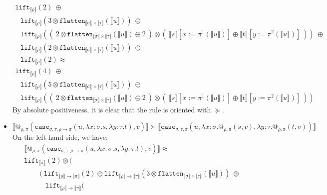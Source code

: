 \documentclass[a4paper,UKenglish,cleveref,autoref,numberwithinsect]{lipics-v2019}
\theoremstyle{definition}
\newcommand{\arrtype}{\rightarrow}
\newcommand{\abs}[2]{\lambda #1.#2}
\newcommand{\flatten}{\mathtt{flatten}}
\newcommand{\lift}{\mathtt{lift}}
\newcommand{\typeinterpret}[1]{\llbracket #1 \rrbracket}
\newcommand{\interpret}[1]{\llbracket #1 \rrbracket}
\begin{document}
\begin{itemize}
\[\begin{array}{l}
  \lift_{\typeinterpret{\rho}}(2)\ \oplus \\
  \phantom{A}
  \lift_{\typeinterpret{\rho}}(3 \otimes \flatten_{\typeinterpret{
    \sigma} \times \typeinterpret{\tau}}(\interpret{u}))\ \oplus \\
  \phantom{A}
  \lift_{\typeinterpret{\rho}}((\ 2 \otimes \flatten_{\typeinterpret{
    \sigma} \times \typeinterpret{\tau}}(\interpret{u}) \oplus 2\ )
    \otimes (\ \interpret{s}[x:=\pi^1(\interpret{u})] \oplus
    \interpret{t}[y:=\pi^2(\interpret{u})]\ ))\ \oplus \\
  \phantom{A}
  \lift_{\typeinterpret{\rho}}(2 \otimes \flatten_{\typeinterpret{\sigma}
    \times \typeinterpret{\tau}}(\interpret{u}))\ \oplus \\
  \phantom{A}
    \lift_{\typeinterpret{\rho}}(2) \approx \\
  \lift_{\typeinterpret{\rho}}(4)\ \oplus \\
  \phantom{A}
  \lift_{\typeinterpret{\rho}}(5 \otimes \flatten_{\typeinterpret{
    \sigma} \times \typeinterpret{\tau}}(\interpret{u}))\ \oplus \\
  \phantom{A}
  \lift_{\typeinterpret{\rho}}((\ 2 \otimes \flatten_{\typeinterpret{
    \sigma} \times \typeinterpret{\tau}}(\interpret{u}) \oplus 2\ )
    \otimes (\ \interpret{s}[x:=\pi^1(\interpret{u})] \oplus
    \interpret{t}[y:=\pi^2(\interpret{u})]\ ) )
  \end{array}
  \]
  By absolute positiveness, it is clear that the rule is oriented
  with $\succeq$.
\item $\interpret{@_{\rho,\pi}(\mathtt{case}_{\sigma,\tau,\rho
  \arrtype \pi}(u,\abs{x:\sigma}{s},\abs{y:\tau}{t}),v)} \succ
  \interpret{\mathtt{case}_{\sigma,\tau,\pi}(u,\abs{x:\sigma}{
  @_{\rho,\pi}(s,v)},\abs{y:\tau}{@_{\rho,\pi}(t,v)})}$ \\
  On the left-hand side, we have:
  \[
  \begin{array}{l}
  \interpret{@_{\rho,\pi}(\mathtt{case}_{\sigma,\tau,\rho \arrtype
  \pi}(u,\abs{x:\sigma}{s},\abs{y:\tau}{t}),v)} \approx \\
  \lift_{\typeinterpret{\pi}}(2) \otimes (\\
    \phantom{ABC}
    (\ \lift_{\typeinterpret{\rho} \arrtype \typeinterpret{\pi}}(2)
       \oplus \lift_{\typeinterpret{\rho} \arrtype
       \typeinterpret{\pi}}(3 \otimes \flatten_{\typeinterpret{\sigma}
       \times \typeinterpret{\tau}}(\interpret{u}))\ \oplus \\
    \phantom{ABCD}
      \lift_{\typeinterpret{\rho} \arrtype \typeinterpret{\pi}}(

\end{array}\]
\end{itemize}
\end{document}
